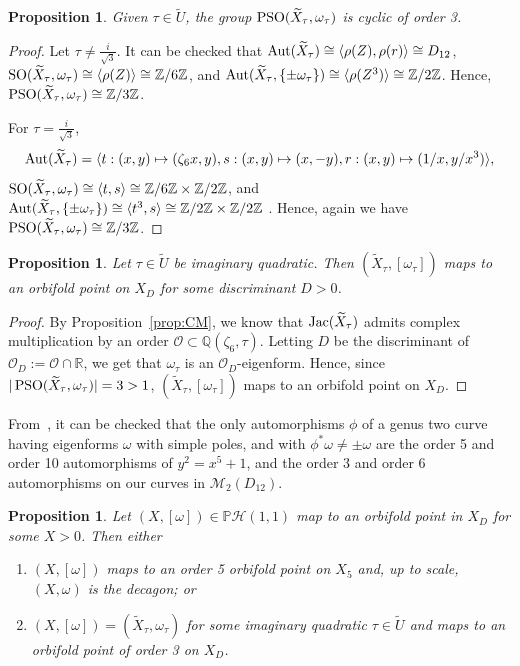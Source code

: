 \documentclass[a4paper,11pt]{amsart}
\numberwithin{equation}{section}
\numberwithin{figure}{section}
\numberwithin{table}{section}
\newtheorem{proposition}[theorem]{Proposition}
\newcommand{\calH}{\mathcal{H}}
\newcommand{\Z}{\mathbb{Z}}
\newcommand{\R}{\mathbb{R}}
\newcommand{\Q}{\mathbb{Q}}
\DeclareMathOperator{\SO}{{\rm{SO}}}
\DeclareMathOperator{\PSO}{{\rm{PSO}}}
\DeclareMathOperator{\Aut}{{\rm{Aut}}}
\DeclareMathOperator{\Jac}{{\rm{Jac}}}
\begin{document}
\begin{proposition}
    Given $\tau\in\widetilde{U}$, the group $\PSO(\widetilde{X}_{\tau},\omega_{\tau})$ is cyclic of order 3.
\end{proposition}

\begin{proof}
    Let $\tau\neq\frac{i}{\sqrt{3}}$. It can be checked that $\Aut(\widetilde{X}_{\tau}) \cong \langle\rho(Z),\rho(r)\rangle\cong D_{12}$, $\SO(\widetilde{X}_{\tau},\omega_\tau)\cong\langle\rho(Z)\rangle\cong\Z/6\Z$, and $\Aut(\widetilde{X}_{\tau},\{\pm\omega_{\tau}\})\cong \langle\rho(Z^{3})\rangle\cong \Z/2\Z$. Hence, $\PSO(\widetilde{X}_{\tau},\omega_\tau)\cong\Z/3\Z$.

    For $\tau = \frac{i}{\sqrt{3}}$,
    $$\Aut(\widetilde{X}_{\tau}) = \langle t:(x,y)\mapsto(\zeta_{6}x,y), s:(x,y)\mapsto(x,-y),r:(x,y)\mapsto(1/x,y/x^3)\rangle,$$ $\SO(\widetilde{X}_{\tau},\omega_\tau)\cong\langle t, s\rangle\cong\Z/6\Z\times\Z/2\Z$, and $\Aut(\widetilde{X}_{\tau},\{\pm\omega_{\tau}\})\cong \langle t^3, s\rangle\cong\Z/2\Z\times\Z/2\Z$ . Hence, again we have $\PSO(\widetilde{X}_{\tau},\omega_\tau)\cong\Z/3\Z$.
\end{proof}

\begin{proposition}
    Let $\tau\in\widetilde{U}$ be imaginary quadratic. Then $(\widetilde{X}_{\tau},[\omega_{\tau}])$ maps to an orbifold point on $X_{D}$ for some discriminant $D>0$.
\end{proposition}

\begin{proof}
    By Proposition~\ref{prop:CM}, we know that $\Jac(\widetilde{X}_{\tau})$ admits complex multiplication by an order $\mathcal{O}\subset\Q(\zeta_{6},\tau)$. Letting $D$ be the discriminant of $\mathcal{O}_{D}:=\mathcal{O}\cap\R$, we get that $\omega_{\tau}$ is an $\mathcal{O}_{D}$-eigenform. Hence, since $|\PSO(\widetilde{X}_{\tau},\omega_{\tau})| = 3 > 1$, $(\widetilde{X}_{\tau},[\omega_{\tau}])$ maps to an orbifold point on $X_{D}$.
\end{proof}

From~\cite[Table 2]{Muk}, it can be checked that the only automorphisms $\phi$ of a genus two curve having eigenforms $\omega$ with simple poles, and with $\phi^{*}\omega\neq \pm \omega$ are the order 5 and order 10 automorphisms of $y^2 = x^5+1$, and the order 3 and order 6 automorphisms on our curves in $\mathcal{M}_{2}(D_{12})$.

\begin{proposition}
    Let $(X,[\omega])\in\mathbb{P}\calH(1,1)$ map to an orbifold point in $X_{D}$ for some $X>0$. Then either
    \begin{enumerate}
        \item $(X,[\omega])$ maps to an order 5 orbifold point on $X_{5}$ and, up to scale, $(X,\omega)$ is the decagon; or
        \item $(X,[\omega]) = (\widetilde{X}_{\tau},\omega_{\tau})$ for some imaginary quadratic $\tau\in\widetilde{U}$ and maps to an orbifold point of order 3 on $X_{D}$.
    \end{enumerate}
\end{proposition}
\end{document}
